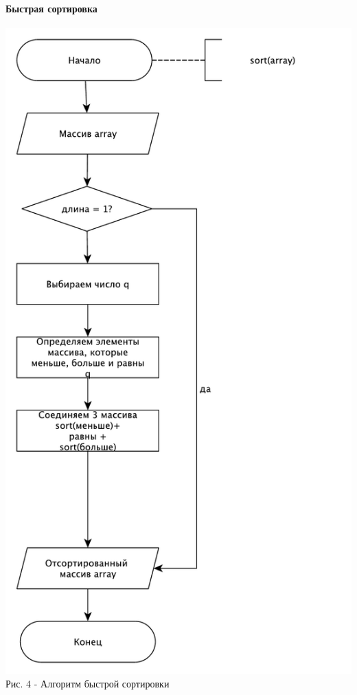 \documentclass[a4paper,14pt]{article} %
\begin{document}
	\hfill
	\paragraph{Быстрая сортировка}
	
	\begin{center}
        		\includegraphics[scale = 0.8]{shema3} \\ Рис. 4 - Алгоритм быстрой сортировки
	\end{center}	
	
\end{document}

